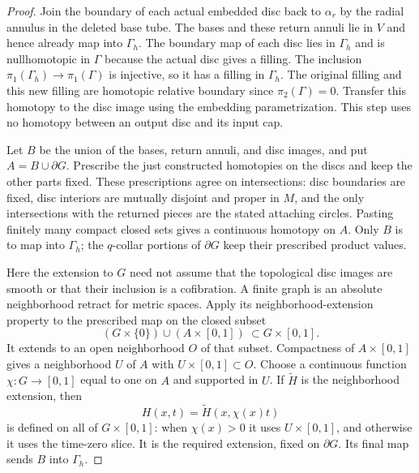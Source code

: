 \begin{proof}
Join the boundary of each actual embedded disc back to
$\alpha_r$ by the radial annulus in the deleted base tube.
The bases and these return annuli lie in $V$ and hence already
map into $\Gamma_h$.  The boundary map of each disc lies in
$\Gamma_h$ and is nullhomotopic in $\Gamma$ because the actual
disc gives a filling.  The inclusion
$\pi_1(\Gamma_h)\longrightarrow\pi_1(\Gamma)$ is injective,
so it has a filling in $\Gamma_h$.  The original filling and
this new filling are homotopic relative boundary since
$\pi_2(\Gamma)=0$.  Transfer this homotopy to the disc image
using the embedding parametrization.  This step uses no
homotopy between an output disc and its input cap.

Let $B$ be the union of the bases, return annuli, and disc
images, and put $A=B\cup\partial G$.  Prescribe the just
constructed homotopies on the discs and keep the other parts
fixed.  These prescriptions agree on intersections: disc
boundaries are fixed, disc interiors are mutually disjoint and
proper in $M$, and the only intersections with the returned
pieces are the stated attaching circles.  Pasting finitely
many compact closed sets gives a continuous homotopy on $A$.
Only $B$ is to map into $\Gamma_h$; the $q$-collar portions
of $\partial G$ keep their prescribed product values.

Here the extension to $G$ need not assume that the topological
disc images are smooth or that their inclusion is a cofibration.
A finite graph is an absolute neighborhood retract for metric
spaces.  Apply its neighborhood-extension property to the
prescribed map on the closed subset
\[
       (G\times\{0\})\cup(A\times[0,1])\ \subset G\times[0,1].
\]
It extends to an open neighborhood $O$ of that subset.  Compactness
of $A\times[0,1]$ gives a neighborhood $U$ of $A$ with
$U\times[0,1]\subset O$.  Choose a continuous function
$\chi:G\longrightarrow[0,1]$ equal to one on $A$ and supported
in $U$.  If $\widetilde H$ is the neighborhood extension, then
\[
             H(x,t)=\widetilde H(x,\chi(x)t)
\]
is defined on all of $G\times[0,1]$: when $\chi(x)>0$ it uses
$U\times[0,1]$, and otherwise it uses the time-zero slice.
It is the required extension, fixed on $\partial G$.  Its final
map sends $B$ into $\Gamma_h$.


\end{proof}

